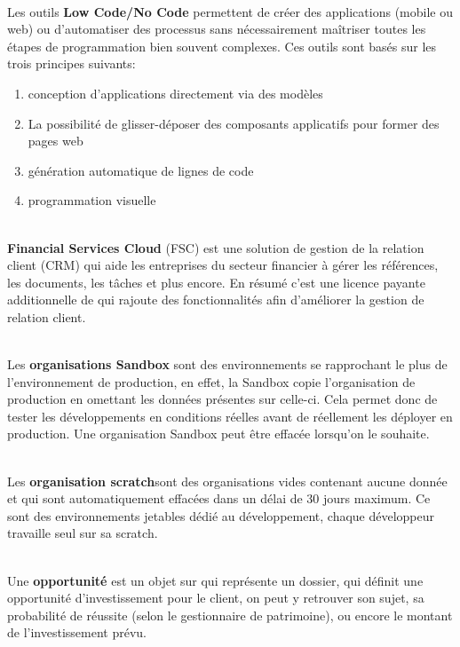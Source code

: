 \documentclass[12pt,oneside,noprintercorrection]{iut}
\begin{document}
     ~\\\indent Les outils \textbf{Low Code/No Code} permettent de créer des applications (mobile ou web) ou d’automatiser des processus sans nécessairement maîtriser toutes les étapes de programmation bien souvent complexes. Ces outils sont basés sur les trois principes suivants: 
    \begin{enumerate}
        \item conception d’applications directement via des modèles
        \item La possibilité de glisser-déposer des composants applicatifs pour former des pages web
        \item génération automatique de lignes de code
        \item programmation visuelle
    \end{enumerate}
    
    ~\\\indent \textbf{Financial Services Cloud} (FSC) est une solution de gestion de la relation client (CRM) qui aide les
entreprises du secteur financier à gérer les références, les documents, les tâches et plus
encore. En résumé c'est une licence payante additionnelle de \slf{} qui rajoute des
fonctionnalités afin d'améliorer la gestion de relation client.\newline


    ~\\\indent Les \textbf{organisations Sandbox} sont des environnements \slf{} se rapprochant le plus de l'environnement de production, en effet, la Sandbox copie l'organisation de production en omettant les données présentes sur celle-ci. Cela permet donc de tester les développements en conditions réelles avant de réellement les déployer en production. Une organisation Sandbox peut être effacée lorsqu'on le souhaite.\newline
    
    ~\\\indent Les \textbf{organisation scratch}sont des organisations vides contenant aucune donnée et qui sont automatiquement effacées dans un délai de 30 jours maximum. Ce sont des environnements jetables dédié au développement, chaque développeur travaille seul sur sa scratch.\newline


    ~\\\indent Une \textbf{opportunité} est un objet sur \slf{} qui représente un dossier, qui définit une opportunité d'investissement pour le client, on peut y retrouver son sujet, sa probabilité de réussite (selon le gestionnaire de patrimoine), ou encore le montant de l'investissement prévu.\newline
\end{document}
